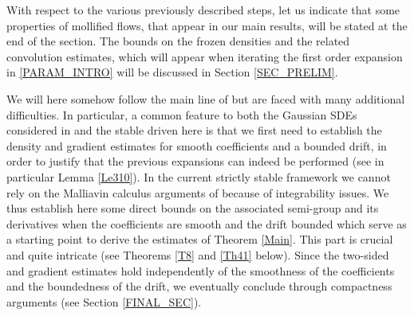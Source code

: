 {With respect to the various previously described steps, let us indicate that some properties of mollified flows, that appear in our main results, will be stated at the end of the section. The bounds on the frozen densities and the related convolution estimates, which will appear when iterating the first order expansion in \eqref{PARAM_INTRO} will be discussed in Section \ref{SEC_PRELIM}.}

We will here somehow follow the main line of \cite{meno:pesc:zhan:20} but are faced with many additional difficulties. In particular, a common feature to both the Gaussian SDEs considered in \cite{meno:pesc:zhan:20} and the stable driven here is that we first need to establish the density and gradient estimates for smooth coefficients and a bounded drift, in order to justify that the previous expansions can indeed be performed (see in particular Lemma \ref{Le310}).
In the current strictly stable framework we cannot rely on the Malliavin calculus arguments of \cite{meno:pesc:zhan:20} because of integrability issues.
We thus establish here some direct bounds on the associated semi-group and its derivatives when the coefficients are smooth and {the drift bounded} which serve as a starting point to derive the estimates of Theorem \ref{Main}. This part is crucial and quite intricate (see Theorems {\ref{T8} and} \ref{Th41} below).
Since the two-sided and gradient estimates hold independently of the smoothness of the coefficients and the boundedness of the drift, we eventually conclude through compactness arguments (see Section \ref{FINAL_SEC}).

